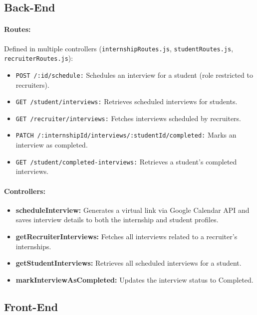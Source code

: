 \subsection*{Back-End}
\paragraph{Routes:} Defined in multiple controllers (\texttt{internshipRoutes.js}, \texttt{studentRoutes.js}, \texttt{recruiterRoutes.js}):
\begin{itemize}
    \item \texttt{POST /:id/schedule:} Schedules an interview for a student (role restricted to recruiters).
    \item \texttt{GET /student/interviews:} Retrieves scheduled interviews for students.
    \item \texttt{GET /recruiter/interviews:} Fetches interviews scheduled by recruiters.
    \item \texttt{PATCH /:internshipId/interviews/:studentId/completed:} Marks an interview as completed.
    \item \texttt{GET /student/completed-interviews:} Retrieves a student’s completed interviews.
\end{itemize}

\paragraph{Controllers:}
\begin{itemize}
    \item \textbf{scheduleInterview:} Generates a virtual link via Google Calendar API and saves interview details to both the internship and student profiles.
    \item \textbf{getRecruiterInterviews:} Fetches all interviews related to a recruiter’s internships.
    \item \textbf{getStudentInterviews:} Retrieves all scheduled interviews for a student.
    \item \textbf{markInterviewAsCompleted:} Updates the interview status to Completed.
\end{itemize}

\subsection*{Front-End}
